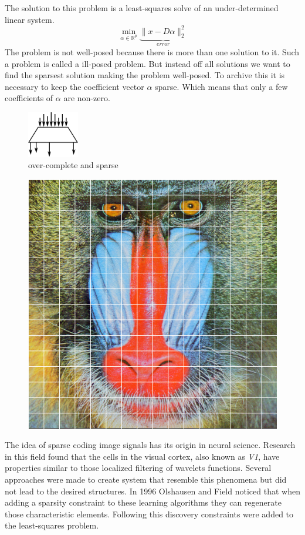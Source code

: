 The solution to this problem is a least-squares solve of an under-determined
linear system.
\begin{equation}
\min_{\alpha\in\mathbb{R}^{p}} \underbrace{\lVert x - D\alpha
\rVert^{2}_{2}}_{error} \label{eq:problem}
\end{equation}
The problem is not well-posed because there is more than one
solution to it. Such a problem is called a ill-posed problem.
But instead off all solutions we want to find the sparsest
solution making the problem well-posed. To archive this it is necessary to keep
the coefficient vector $\alpha$ sparse. Which means that only a few coefficients
of $\alpha$ are non-zero. 
\begin{figure}[h]
\centering
\includegraphics[width = 0.20\textwidth]{images/sparse.pdf}
\caption{over-complete and sparse}
\label{fig:sparse}
\end{figure}

\begin{figure}[h]
\centering
\includegraphics[scale = 0.25]{images/segmentation.png}
\caption{}
\label{fig:sparse}
\end{figure}
The idea of sparse coding image signals has its origin in neural science. 
Research in this field found that the cells in the visual cortex, also known as
\emph{V1}, have properties similar to those localized filtering of wavelets
functions. Several approaches were made to create system that resemble this
phenomena but did not lead to the desired structures. In 1996 Olshausen and
Field\cite{Olshausen1996} noticed that when adding a sparsity constraint to
these learning algorithms they can regenerate those characteristic elements.
Following this discovery constraints were added to the least-squares problem.


